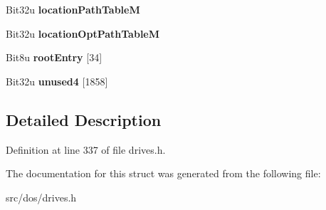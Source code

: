 \begin{DoxyCompactItemize}
\item 
\hypertarget{structisoPVD_ac7c7394e29ebb216df4029953ab6b337}{Bit32u {\bfseries location\-Path\-Table\-M}}\label{structisoPVD_ac7c7394e29ebb216df4029953ab6b337}

\item 
\hypertarget{structisoPVD_a69bb36d8476c0029f6a33b38d1fceb21}{Bit32u {\bfseries location\-Opt\-Path\-Table\-M}}\label{structisoPVD_a69bb36d8476c0029f6a33b38d1fceb21}

\item 
\hypertarget{structisoPVD_ac597b7476c7b1e6573c8ea621c423df8}{Bit8u {\bfseries root\-Entry} \mbox{[}34\mbox{]}}\label{structisoPVD_ac597b7476c7b1e6573c8ea621c423df8}

\item 
\hypertarget{structisoPVD_a78b65797080943af3276b8f142544450}{Bit32u {\bfseries unused4} \mbox{[}1858\mbox{]}}\label{structisoPVD_a78b65797080943af3276b8f142544450}

\end{DoxyCompactItemize}


\subsection{Detailed Description}


Definition at line 337 of file drives.\-h.



The documentation for this struct was generated from the following file\-:\begin{DoxyCompactItemize}
\item 
src/dos/drives.\-h\end{DoxyCompactItemize}
